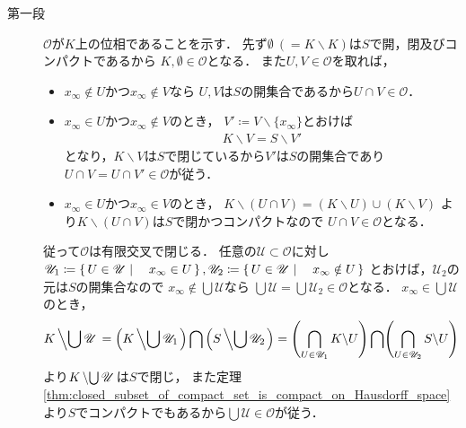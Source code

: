	\begin{prf}\mbox{}
		\begin{description}
			\item[第一段]
				$\mathscr{O}$が$K$上の位相であることを示す．
				先ず$\emptyset\ (= K \backslash K)$は$S$で開，閉及びコンパクトであるから
				$K,\emptyset \in \mathscr{O}$となる．
				また$U,V \in \mathscr{O}$を取れば，
				\begin{itemize}
					\item $x_\infty \notin U$かつ$x_\infty \notin V$なら
						$U,V$は$S$の開集合であるから$U \cap V \in \mathscr{O}$．
					
					\item $x_\infty \in U$かつ$x_\infty \notin V$のとき，
						$V' \coloneqq V \backslash \{x_\infty\}$とおけば
						\begin{align}
							K \backslash V = S \backslash V'
						\end{align}
						となり，$K \backslash V$は$S$で閉じているから$V'$は$S$の開集合であり
						$U \cap V = U \cap V' \in \mathscr{O}$が従う．
						
					\item $x_\infty \in U$かつ$x_\infty \in V$のとき，
						$K \backslash (U \cap V)= (K \backslash U) \cup (K \backslash V)$
						より$K \backslash (U \cap V)$は$S$で閉かつコンパクトなので
						$U \cap V \in \mathscr{O}$となる．
				\end{itemize}
				従って$\mathscr{O}$は有限交叉で閉じる．
				任意の$\mathscr{U} \subset \mathscr{O}$に対し
				$\mathscr{U}_1 \coloneqq \left\{\, U \in \mathscr{U} \mid \quad x_\infty \in U\, \right\},
				\mathscr{U}_2 \coloneqq \left\{\, U \in \mathscr{U} \mid \quad x_\infty \notin U\, \right\}$
				とおけば，$\mathscr{U}_2$の元は$S$の開集合なので
				$x_\infty \notin \bigcup \mathscr{U}$なら
				$\bigcup \mathscr{U} = \bigcup \mathscr{U}_2 \in \mathscr{O}$となる．
				$x_\infty \in \bigcup \mathscr{U}$のとき，
				\begin{align}
					K \left\backslash \bigcup \mathscr{U} \right.
					= \left(K \left\backslash \bigcup \mathscr{U}_1 \right.\right)
					\bigcap \left(S \left\backslash \bigcup \mathscr{U}_2 \right.\right)
					= \Biggl( \bigcap_{U \in \mathscr{U}_1} K \backslash U \Biggr)
					\bigcap \Biggl( \bigcap_{U \in \mathscr{U}_2} S \backslash U \Biggr)
				\end{align}
				より$K\left\backslash \bigcup \mathscr{U}\right.$は$S$で閉じ，
				また定理\ref{thm:closed_subset_of_compact_set_is_compact_on_Hausdorff_space}
				より$S$でコンパクトでもあるから$\bigcup \mathscr{U} \in \mathscr{O}$が従う．
				

\end{description}
\end{prf}
